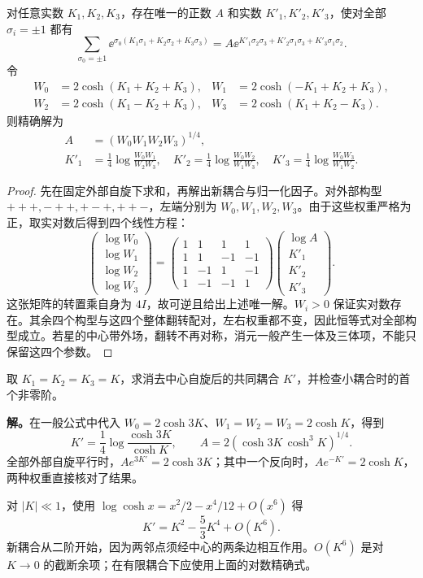 \begin{theorem}
对任意实数 $K_1,K_2,K_3$，存在唯一的正数 $A$ 和实数 $K'_1,K'_2,K'_3$，使对全部 $\sigma_i=\pm1$ 都有
\begin{equation}
 \sum_{\sigma_0=\pm1}\ee^{\sigma_0(K_1\sigma_1+K_2\sigma_2+K_3\sigma_3)}
 =A \ee^{K'_1\sigma_2\sigma_3+K'_2\sigma_1\sigma_3+K'_3\sigma_1\sigma_2}.
 \label{eq:phys-sm-star-triangle}
\end{equation}
令
\begin{align*}
 W_0&=2\cosh(K_1+K_2+K_3),&W_1&=2\cosh(-K_1+K_2+K_3),\\
 W_2&=2\cosh(K_1-K_2+K_3),&W_3&=2\cosh(K_1+K_2-K_3).
\end{align*}
则精确解为
\begin{align*}
 A&=(W_0W_1W_2W_3)^{1/4},\\
 K'_1&=\tfrac14\log\frac{W_0W_1}{W_2W_3},\quad
 K'_2=\tfrac14\log\frac{W_0W_2}{W_1W_3},\quad
 K'_3=\tfrac14\log\frac{W_0W_3}{W_1W_2}.
\end{align*}
\end{theorem}
\begin{proof}
先在固定外部自旋下求和，再解出新耦合与归一化因子。对外部构型 $+++,-++,+-+,++-$，左端分别为 $W_0,W_1,W_2,W_3$。由于这些权重严格为正，取实对数后得到四个线性方程：
\[
 \begin{pmatrix}\log W_0\\\log W_1\\\log W_2\\\log W_3\end{pmatrix}
 =\begin{pmatrix}1&1&1&1\\1&1&-1&-1\\1&-1&1&-1\\1&-1&-1&1\end{pmatrix}
 \begin{pmatrix}\log A\\K'_1\\K'_2\\K'_3\end{pmatrix}.
\]
这张矩阵的转置乘自身为 $4I$，故可逆且给出上述唯一解。$W_i>0$ 保证实对数存在。其余四个构型与这四个整体翻转配对，左右权重都不变，因此恒等式对全部构型成立。若星的中心带外场，翻转不再对称，消元一般产生一体及三体项，不能只保留这四个参数。
\end{proof}

\begin{workedexample}[各向同性消元的精确式与小耦合检查]
取 $K_1=K_2=K_3=K$，求消去中心自旋后的共同耦合 $K'$，并检查小耦合时的首个非零阶。

\textbf{解。}在一般公式中代入 $W_0=2\cosh3K$、$W_1=W_2=W_3=2\cosh K$，得到
\[
 K'=\frac14\log\frac{\cosh3K}{\cosh K},\qquad
 A=2(\cosh3K\,\cosh^3K)^{1/4}.
\]
全部外部自旋平行时，$Ae^{3K'}=2\cosh3K$；其中一个反向时，$Ae^{-K'}=2\cosh K$，两种权重直接核对了结果。

对 $|K|\ll1$，使用 $\log\cosh x=x^2/2-x^4/12+O(x^6)$ 得
\[
 K'=K^2-\frac53K^4+O(K^6).
\]
新耦合从二阶开始，因为两邻点须经中心的两条边相互作用。$O(K^6)$ 是对 $K\to0$ 的截断余项；在有限耦合下应使用上面的对数精确式。
\end{workedexample}

